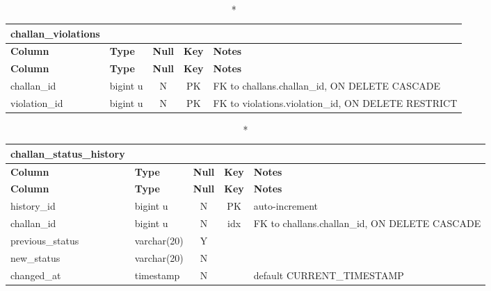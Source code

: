 \vspace{-0.4em}
\begin{longtable}{@{}p{3.4cm}p{2.9cm}c c p{5.6cm}@{}}
\caption*{\textbf{challan\_\allowbreak{}violations}}\\
\toprule \textbf{Column} & \textbf{Type} & \textbf{Null} & \textbf{Key} & \textbf{Notes} \\ \midrule \endfirsthead
\toprule \textbf{Column} & \textbf{Type} & \textbf{Null} & \textbf{Key} & \textbf{Notes} \\ \midrule \endhead
\bottomrule \endlastfoot
challan\_\allowbreak{}id & bigint u & N & PK & FK to challans.challan\_\allowbreak{}id, ON DELETE CASCADE \\
violation\_\allowbreak{}id & bigint u & N & PK & FK to violations.violation\_\allowbreak{}id, ON DELETE RESTRICT \\
\end{longtable}
\vspace{-0.4em}
\begin{longtable}{@{}p{3.4cm}p{2.9cm}c c p{5.6cm}@{}}
\caption*{\textbf{challan\_\allowbreak{}status\_\allowbreak{}history}}\\
\toprule \textbf{Column} & \textbf{Type} & \textbf{Null} & \textbf{Key} & \textbf{Notes} \\ \midrule \endfirsthead
\toprule \textbf{Column} & \textbf{Type} & \textbf{Null} & \textbf{Key} & \textbf{Notes} \\ \midrule \endhead
\bottomrule \endlastfoot
history\_\allowbreak{}id & bigint u & N & PK & auto-increment \\
challan\_\allowbreak{}id & bigint u & N & idx & FK to challans.challan\_\allowbreak{}id, ON DELETE CASCADE \\
previous\_\allowbreak{}status & varchar(20) & Y &  &  \\
new\_\allowbreak{}status & varchar(20) & N &  &  \\
changed\_\allowbreak{}at & timestamp & N &  & default CURRENT\_\allowbreak{}TIMESTAMP \\
\end{longtable}
\vspace{-0.4em}
